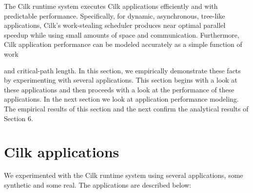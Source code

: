 \documentclass[
]{article}
\begin{document}
The Cilk runtime system executes Cilk applications efficiently and with
predictable performance. Specifically, for dynamic, asynchronous,
tree-like applications, Cilk's work-stealing scheduler produces near
optimal parallel speedup while using small amounts of space and
communication. Furthermore, Cilk application performance can be modeled
accurately as a simple function of work

and critical-path length. In this section, we empirically demonstrate
these facts by experimenting with several applications. This section
begins with a look at these applications and then proceeds with a look
at the performance of these applications. In the next section we look at
application performance modeling. The empirical results of this section
and the next confirm the analytical results of Section 6.

\section{Cilk applications}\label{cilk-applications}

We experimented with the Cilk runtime system using several applications,
some synthetic and some real. The applications are described below:
\end{document}
